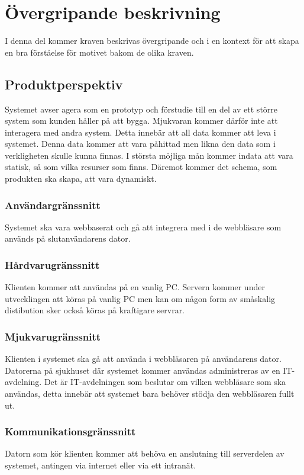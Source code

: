 \documentclass{article}
\begin{document}
\section{Övergripande beskrivning}
\label{sec:overall}
I denna del kommer kraven beskrivas övergripande och i en kontext för att
skapa en bra förståelse för motivet bakom de olika kraven.

\subsection{Produktperspektiv}
\label{subsec:Produktperspektiv}
Systemet avser agera som en prototyp och förstudie till en del av ett större
system som kunden håller på att bygga.
Mjukvaran kommer därför inte att interagera med andra system. Detta innebär att all
data kommer att leva i systemet. Denna data kommer att vara påhittad men likna
den data som i verkligheten skulle kunna finnas.
I största möjliga mån kommer indata att vara statisk, så som vilka resurser som
finns. Däremot kommer det schema, som produkten ska skapa, att vara dynamiskt.
\subsubsection{Användargränssnitt}
\label{subsec:Anvandargranssnitt}
Systemet ska vara webbaserat och gå att integrera med i de webbläsare som
används på slutanvändarens dator.
\subsubsection{Hårdvarugränssnitt}
\label{subsec:Hardvarugranssnitt}
Klienten kommer att användas på en vanlig PC. Servern kommer under utvecklingen
att köras på vanlig PC men kan om någon form av småskalig distibution sker
också köras på kraftigare servrar.
\subsubsection{Mjukvarugränssnitt}
\label{subsec:Mjukvarugranssnitt}
Klienten i systemet ska gå att använda i webbläsaren på användarens dator.
Datorerna på sjukhuset där systemet kommer användas administreras av en
IT-avdelning. Det är IT-avdelningen som beslutar om vilken webbläsare som ska
användas, detta innebär att systemet bara behöver stödja den webbläsaren fullt
ut.
\subsubsection{Kommunikationsgränssnitt}
\label{subsec:Kommunikationsgranssnitt}
Datorn som kör klienten kommer att behöva en
anslutning till serverdelen av systemet, antingen via internet eller via ett
intranät.
\end{document}
